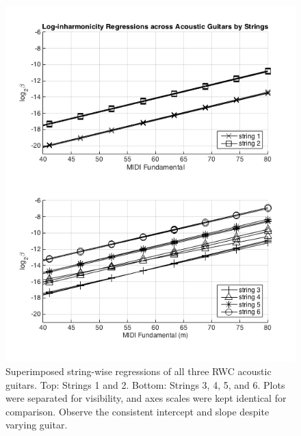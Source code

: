 \documentclass[12pt]{cmuthesis}
\begin{document}
\begin{figure}[!htbp] 
\centering
\includegraphics[scale=0.75]{traj-compare-ag}
\caption{Superimposed string-wise regressions of all three RWC acoustic guitars. Top: Strings 1 and 2. Bottom: Strings 3, 4, 5, and 6. Plots were separated for visibility, and axes scales were kept identical for comparison. Observe the consistent intercept and slope despite varying guitar.}
\label{fig:ag-traj-comp}
\end{figure}
\end{document}
